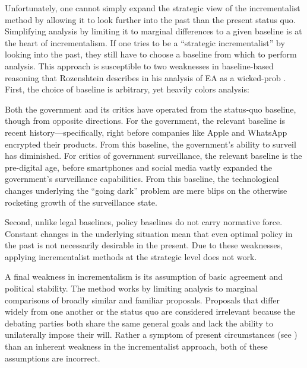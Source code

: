 Unfortunately, one cannot simply expand the strategic view of the incrementalist method by allowing it to look further
into the past than the present status quo. Simplifying analysis by limiting it to marginal differences to a given
baseline is at the heart of \ac{incrementalism}. If one tries to be a ``strategic incrementalist'' by looking into the
past, they still have to choose a baseline from which to perform analysis. This approach is susceptible to two
weaknesses in baseline-based reasoning that Rozenshtein describes in his analysis of \ac{EA} as a \ac{wicked-prob}
\cite{rozenshtein_wicked_2018}. First, the choice of baseline is arbitrary, yet heavily colors analysis:

\begin{displayquote}
Both the government and its critics have operated from the status-quo baseline, though from opposite directions. For the
government, the relevant baseline is recent history---specifically, right before companies like Apple and WhatsApp
encrypted their products. From this baseline, the government's ability to surveil has diminished. For critics of
government surveillance, the relevant baseline is the pre-digital age, before smartphones and social media vastly
expanded the government's surveillance capabilities. From this baseline, the technological changes underlying the
``going dark'' problem are mere blips on the otherwise rocketing growth of the surveillance state.
\cite{rozenshtein_wicked_2018}
\end{displayquote}

Second, unlike legal baselines, policy baselines do not carry normative force. Constant changes in the underlying
situation mean that even optimal policy in the past is not necessarily desirable in the present. Due to these
weaknesses, applying incrementalist methods at the strategic level does not work.

A final weakness in \ac{incrementalism} is its assumption of basic agreement and political stability. The method works
by limiting analysis to marginal comparisons of broadly similar and familiar proposals. Proposals that differ widely
from one another or the status quo are considered irrelevant because the debating parties both share the same general
goals and lack the ability to unilaterally impose their will. Rather a symptom of present circumstances (see
) than an inherent weakness in the incrementalist approach, both of these assumptions are
incorrect.



